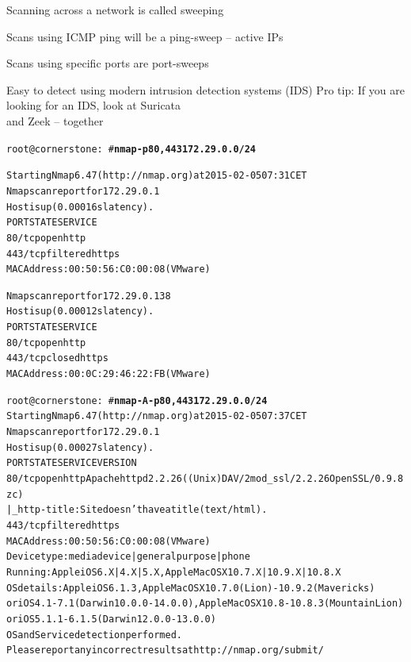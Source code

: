 \documentclass[Screen16to9,17pt]{foils}
\begin{document}

\begin{list1}
\item Scanning across a network is called sweeping
\item Scans using ICMP ping will be a ping-sweep -- active IPs
\item Scans using specific ports are port-sweeps
\item Easy to detect using modern intrusion detection systems (IDS)
\vskip 2cm
Pro tip: If you are looking for an IDS, look at Suricata \\
and Zeek  -- together
\end{list1}


\begin{alltt}\small
root@cornerstone:~#{\bfseries  nmap -p80,443 172.29.0.0/24}

Starting Nmap 6.47 ( http://nmap.org ) at 2015-02-05 07:31 CET
Nmap scan report for 172.29.0.1
Host is up (0.00016s latency).
PORT    STATE    SERVICE
{\color{darkgreen}80/tcp  open     http}
443/tcp filtered https
MAC Address: 00:50:56:C0:00:08 (VMware)

Nmap scan report for 172.29.0.138
Host is up (0.00012s latency).
PORT    STATE  SERVICE
{\color{darkgreen}80/tcp  open   http}
443/tcp closed https
MAC Address: 00:0C:29:46:22:FB (VMware)

\end{alltt}


\begin{alltt}\footnotesize
root@cornerstone:~#{\bfseries nmap -A -p80,443 172.29.0.0/24}
Starting Nmap 6.47 ( http://nmap.org ) at 2015-02-05 07:37 CET
Nmap scan report for 172.29.0.1
Host is up (0.00027s latency).
PORT    STATE    SERVICE VERSION
80/tcp  open     http    Apache httpd 2.2.26 ((Unix) DAV/2 mod_ssl/2.2.26 OpenSSL/0.9.8zc)
|_http-title: Site doesn't have a title (text/html).
443/tcp filtered https
MAC Address: 00:50:56:C0:00:08 (VMware)
Device type: media device|general purpose|phone
Running: Apple iOS 6.X|4.X|5.X, Apple Mac OS X 10.7.X|10.9.X|10.8.X
OS details: Apple iOS 6.1.3, Apple Mac OS X 10.7.0 (Lion) - 10.9.2 (Mavericks)
or iOS 4.1 - 7.1 (Darwin 10.0.0 - 14.0.0), Apple Mac OS X 10.8 - 10.8.3 (Mountain Lion)
or iOS 5.1.1 - 6.1.5 (Darwin 12.0.0 - 13.0.0)
OS and Service detection performed.
Please report any incorrect results at http://nmap.org/submit/
\end{alltt}
\end{document}
